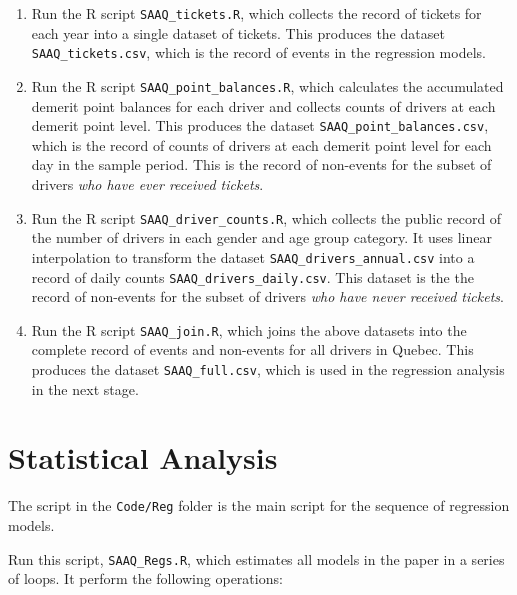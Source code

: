 \documentclass[11pt]{paper}
\begin{document}
\begin{enumerate}

\item Run the R script \texttt{SAAQ\_tickets.R}, which
	collects the record of tickets for each year into a 
	single dataset of tickets. 
	 This produces the dataset \texttt{SAAQ\_tickets.csv}, 
	  which is the record of events in the regression models. 

\item Run the R script \texttt{SAAQ\_point\_balances.R}, which
  calculates the accumulated demerit point balances
  for each driver and collects counts of drivers at each 
  demerit point level. 
	 This produces the dataset \texttt{SAAQ\_point\_balances.csv}, 
	  which is the record of counts of drivers at each 
  demerit point level for each day in the sample period.
  This is the record of non-events for the subset of drivers
  \emph{who have ever received tickets}. 

\item Run the R script \texttt{SAAQ\_driver\_counts.R}, which
  collects the public record of the number of drivers in 
  each gender and age group category. 
  It uses linear interpolation to transform 
  the dataset \texttt{SAAQ\_drivers\_annual.csv}
  into a record of daily counts \texttt{SAAQ\_drivers\_daily.csv}. 
	 This dataset is the the record of non-events for the subset 
	 of drivers   \emph{who have never received tickets}. 


\item Run the R script \texttt{SAAQ\_join.R}, which
  joins the above datasets into the complete record of 
  events and non-events for all drivers in Quebec. 
	 This produces the dataset \texttt{SAAQ\_full.csv}, 
	  which is used in the regression analysis in the next stage.
  
\end{enumerate}


\section*{Statistical Analysis}

The script in the \texttt{Code/Reg} folder  
is the main script for 
the sequence of regression models. 

Run this script, \texttt{SAAQ\_Regs.R}, which
estimates all models in the paper in a series of loops. 
It perform the following operations:
\end{document}
